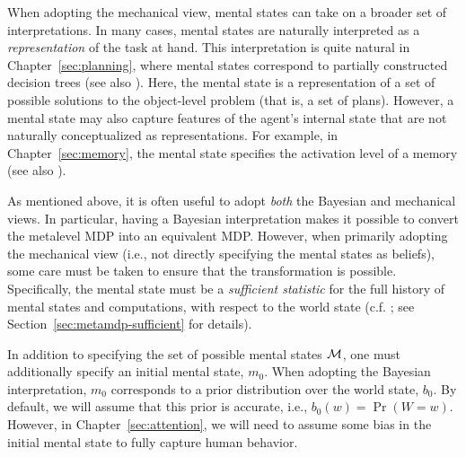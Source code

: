 When adopting the mechanical view, mental states can take on a broader set of interpretations. In many cases, mental states are naturally interpreted as a \emph{representation} of the task at hand. This interpretation is quite natural in Chapter~\ref{sec:planning}, where mental states correspond to partially constructed decision trees (see also \citealp[Chapter 5]{hay2016principles}). Here, the mental state is a representation of a set of possible solutions to the object-level problem (that is, a set of plans). However, a mental state may also capture features of the agent's internal state that are not naturally conceptualized as representations. For example, in Chapter~\ref{sec:memory}, the mental state specifies the activation level of a memory (see also \citealp{suchow2016deciding}).

As mentioned above, it is often useful to adopt \emph{both} the Bayesian and mechanical views. In particular, having a Bayesian interpretation makes it possible to convert the metalevel MDP into an equivalent MDP. However, when primarily adopting the mechanical view (i.e., not directly specifying the mental states as beliefs), some care must be taken to ensure that the transformation is possible. Specifically, the mental state must be a \emph{sufficient statistic} for the full history of mental states and computations, with respect to the world state (c.f. \citealp{kaelbling1998planningb}; see Section~\ref{sec:metamdp-sufficient} for details).

In addition to specifying the set of possible mental states $\mathcal{M}$, one must additionally specify an initial mental state, $m_0$. When adopting the Bayesian interpretation, $m_0$ corresponds to a prior distribution over the world state, $b_0$. By default, we will assume that this prior is accurate, i.e., $b_0(w) = \Pr(W=w)$. However, in Chapter~\ref{sec:attention}, we will need to assume some bias in the initial mental state to fully capture human behavior.



